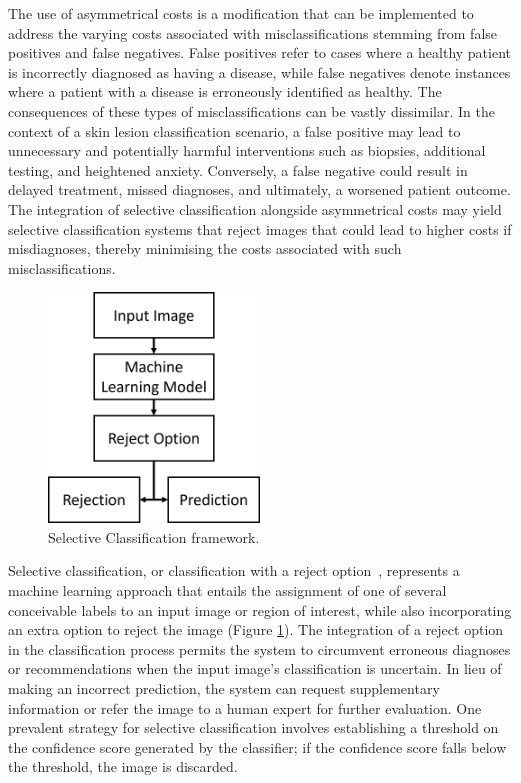 The use of asymmetrical costs is a modification that can be implemented to address the varying costs associated with misclassifications stemming from false positives and false negatives. False positives refer to cases where a healthy patient is incorrectly diagnosed as having a disease, while false negatives denote instances where a patient with a disease is erroneously identified as healthy. The consequences of these types of misclassifications can be vastly dissimilar. In the context of a skin lesion classification scenario, a false positive may lead to unnecessary and potentially harmful interventions such as biopsies, additional testing, and heightened anxiety. Conversely, a false negative could result in delayed treatment, missed diagnoses, and ultimately, a worsened patient outcome. The integration of selective classification alongside asymmetrical costs may yield selective classification systems that reject images that could lead to higher costs if misdiagnoses, thereby minimising the costs associated with such misclassifications.

\begin{figure}[t]
	\centering
	\includegraphics[width=0.5\textwidth]{images/selective_classification.png}
	\caption{Selective Classification framework.}
	\label{fig:selective_classification}
\end{figure}

Selective classification, or classification with a reject option~\citep{chow1957optimum}, represents a machine learning approach that entails the assignment of one of several conceivable labels to an input image or region of interest, while also incorporating an extra option to reject the image (Figure \ref{fig:selective_classification}). The integration of a reject option in the classification process permits the system to circumvent erroneous diagnoses or recommendations when the input image's classification is uncertain. In lieu of making an incorrect prediction, the system can request supplementary information or refer the image to a human expert for further evaluation. One prevalent strategy for selective classification involves establishing a threshold on the confidence score generated by the classifier; if the confidence score falls below the threshold, the image is discarded.



